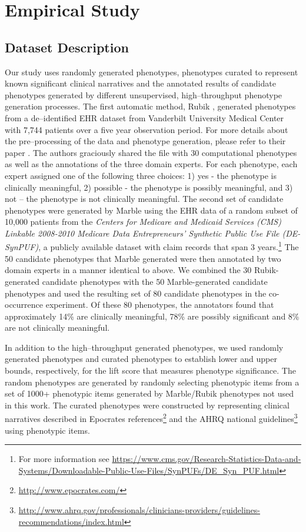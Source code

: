 \documentclass{sig-alternate-05-2015}
\begin{document}
\section{Empirical Study}\label{empirical}

\subsection{Dataset Description}
Our study uses randomly generated phenotypes, phenotypes curated to represent known significant clinical narratives and the annotated results of candidate phenotypes generated by different unsupervised, high--throughput phenotype generation processes. The first automatic method, Rubik \cite{wang2015rubik},
generated phenotypes from a de--identified EHR dataset from Vanderbilt University Medical Center with 7,744 patients over a five year observation period.
For more details about the pre--processing of the data and phenotype generation, please refer to their paper \cite{wang2015rubik}.
The authors graciously shared the file with 30 computational phenotypes as well as the annotations of the three domain experts.
For each phenotype, each expert assigned one of the following three choices: 1) yes - the phenotype is clinically meaningful, 2) possible - the phenotype is possibly meaningful, and 3) not -- the phenotype is not clinically meaningful.
The second set of candidate phenotypes were generated by Marble \cite{Ho:2014da} using the EHR data of a random subset of 10,000 patients from the \emph{ Centers for Medicare and Medicaid Services (CMS) Linkable 2008-2010 Medicare Data Entrepreneurs' Synthetic Public Use File (DE-SynPUF)}, a publicly available dataset with claim records that span 3 years.\footnote{For more information see \url{https://www.cms.gov/Research-Statistics-Data-and-Systems/Downloadable-Public-Use-Files/SynPUFs/DE_Syn_PUF.html}}
The 50 candidate phenotypes that Marble generated were then annotated by two domain experts in a manner identical to above.
We combined the 30 Rubik-generated candidate phenotypes with the 50 Marble-generated candidate phenotypes and used the resulting set of 80 candidate phenotypes in the co-occurrence experiment.
Of these 80 phenotypes,  the annotators found that approximately 14\% are clinically meaningful, 78\% are possibly significant and 8\% are not clinically meaningful.

In addition to the high--throughput generated phenotypes, we used randomly generated phenotypes and curated phenotypes to establish lower and upper bounds, respectively, for the lift score that measures phenotype significance. The random phenotypes are generated by randomly selecting phenotypic items from a set of 1000+ phenotypic items generated by Marble/Rubik phenotypes not used in this work. The curated phenotypes were constructed by representing clinical narratives described in Epocrates references\footnote{\url{http://www.epocrates.com/}} and the AHRQ national guidelines\footnote{\url{http://www.ahrq.gov/professionals/clinicians-providers/guidelines-recommendations/index.html}} using phenotypic items. 
\end{document}
